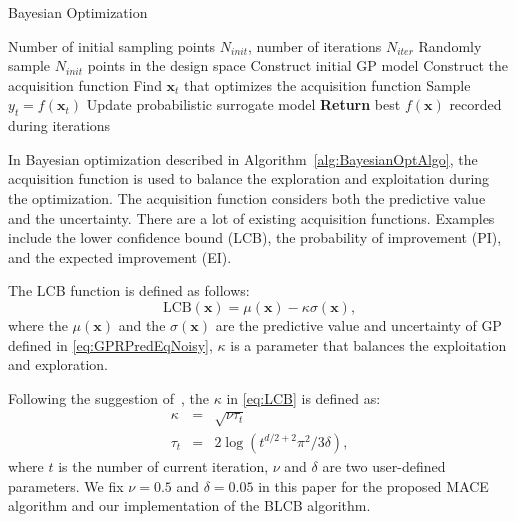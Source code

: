 \begin{algorithm}
    \caption{Bayesian Optimization}
    \label{alg:BayesianOptAlgo}
    \begin{algorithmic}[1]
        \REQUIRE Number of initial sampling points $N_{init}$, number of iterations $N_{iter}$
        \STATE Randomly sample $N_{init}$ points in the design space
        \STATE Construct initial GP model
        \STATE Construct the acquisition function
        \STATE Find $\bm{x}_t$ that optimizes the acquisition function
        \STATE Sample $y_t = f(\bm{x}_t)$
        \STATE Update probabilistic surrogate model
        \ENDFOR
        \STATE \textbf{Return} best $f(\bm{x})$ recorded during iterations
    \end{algorithmic}
\end{algorithm}

In Bayesian optimization described in Algorithm~\ref{alg:BayesianOptAlgo}, the acquisition function is used to balance the exploration and exploitation during the optimization. The acquisition function considers both the predictive value and the uncertainty. There are a lot of existing acquisition functions. Examples include the lower confidence bound (LCB), the probability of improvement (PI), and the expected improvement (EI).

The LCB function is defined as follows:
\begin{equation}
    \label{eq:LCB}
    \mathrm{LCB}(\bm{x}) = \mu(\bm{x}) - \kappa \sigma(\bm{x}),
\end{equation}
where the $\mu(\bm{x})$ and the $\sigma(\bm{x})$ are the predictive value and uncertainty of GP defined in \eqref{eq:GPRPredEqNoisy}, $\kappa$ is a parameter that balances the exploitation and exploration.

Following the suggestion of~\cite{brochu2010tutorial}, the $\kappa$ in \eqref{eq:LCB} is defined as:
\begin{equation}
    \label{eq:LCBKappa}
    \begin{array}{lll}
        \kappa &=& \sqrt{\nu \tau_t} \\
        \tau_t &=& 2 \log(t^{d/2+2} \pi^2 / 3 \delta),
    \end{array}
\end{equation}
where $t$ is the number of current iteration, $\nu$ and $\delta$ are two user-defined parameters. We fix $\nu = 0.5$ and $\delta = 0.05$ in this paper for the proposed MACE algorithm and our implementation of the BLCB algorithm.

